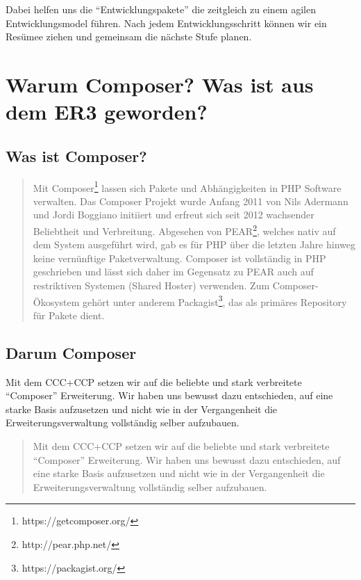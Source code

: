 \documentclass[
paper=a4,
draft=false,%
fontsize=10pt%
]{scrartcl}
\begin{document}
Dabei helfen uns die “Entwicklungspakete” die zeitgleich zu einem agilen Entwicklungsmodel führen. Nach jedem Entwicklungsschritt können wir ein Resümee ziehen und gemeinsam die nächste Stufe planen.

%
%

\newpage

\section{Warum Composer? Was ist aus dem ER3 geworden?}

\subsection{Was ist Composer?}

\begin{quotation}
Mit Composer\footnote{https://getcomposer.org/} lassen sich Pakete und Abhängigkeiten in PHP Software verwalten. Das Composer Projekt wurde Anfang 2011 von Nils Adermann und Jordi Boggiano initiiert und erfreut sich seit 2012 wachsender Beliebtheit und Verbreitung. Abgesehen von PEAR\footnote{http://pear.php.net/}, welches nativ auf dem System ausgeführt wird, gab es für PHP über die letzten Jahre hinweg keine vernünftige Paketverwaltung. Composer ist vollständig in PHP geschrieben und lässt sich daher im Gegensatz zu PEAR auch auf restriktiven Systemen (Shared Hoster) verwenden. Zum Composer-Ökosystem gehört unter anderem Packagist\footnote{https://packagist.org/}, das als primäres Repository für Pakete dient.
\end{quotation}

\subsection{Darum Composer}

Mit dem CCC+CCP setzen wir auf die beliebte und stark verbreitete “Composer” Erweiterung. Wir haben uns bewusst dazu entschieden, auf eine starke Basis aufzusetzen und nicht wie in der Vergangenheit die Erweiterungsverwaltung vollständig selber aufzubauen.

\begin{quotation}
Mit dem CCC+CCP setzen wir auf die beliebte und stark verbreitete “Composer” Erweiterung. Wir haben uns bewusst dazu entschieden, auf eine starke Basis aufzusetzen und nicht wie in der Vergangenheit die Erweiterungsverwaltung vollständig selber aufzubauen. \\
\end{quotation}
\end{document}

